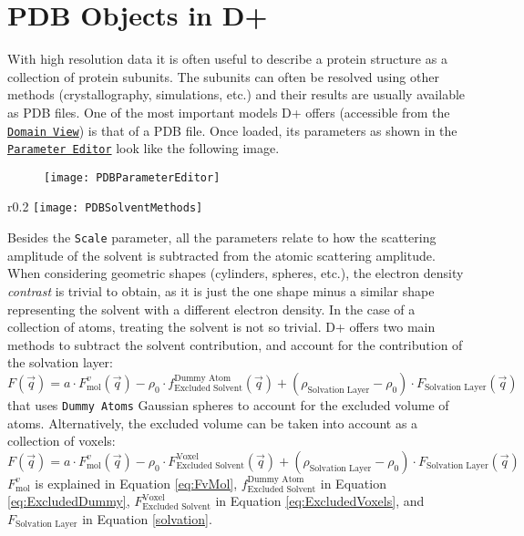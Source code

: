 \documentclass[../D+Manual.tex]{subfiles}
\begin{document}
\section{PDB Objects in D+}

With high resolution data it is often useful to describe a protein structure as a collection of protein subunits.
The subunits can often be resolved using other methods (crystallography, simulations, etc.) and their results are usually available as PDB files.
One of the most important models D+ offers (accessible from the \hyperref[sec:domainView]{\texttt{Domain View}}) is that of a PDB file.
Once loaded, its parameters as shown in the \hyperref[sec:parameterEditor]{\texttt{Parameter Editor}} look like the following image.
\begin{figure}[h]
\centering
\texttt{[image: PDBParameterEditor]}
\label{fig:PDBParameterEditor}
\end{figure}
\begin{wrapfigure}{r}{0.2\textwidth}
	\vspace{-20pt}
	\centering
	\texttt{[image: PDBSolventMethods]}
	\vspace{-30pt}
\end{wrapfigure}
Besides the \texttt{Scale} parameter, all the parameters relate to how the scattering amplitude of the solvent is subtracted from the atomic scattering amplitude.
When considering geometric shapes (cylinders, spheres, etc.), the electron density \textit{contrast} is trivial to obtain, as it is just the one shape minus a similar shape representing the solvent with a different electron density.
In the case of a collection of atoms, treating the solvent is not so trivial.
D+ offers two main methods to subtract the solvent contribution, and account for the contribution of the solvation layer:
\begin{equation}\label{sv}
F(\vec{q})=a\cdot F^v_{\text{mol}}(\vec{q}) - \rho_{0}\cdot f_{\text{Excluded Solvent}}^{\text{Dummy Atom}}(\vec{q}) + \left(\rho_{\text{Solvation Layer}}-\rho_{0}\right) \cdot F_\text{Solvation Layer}\left(\vec{q}\right)
\end{equation}
that uses \texttt{Dummy Atoms} Gaussian spheres to account for the excluded volume of atoms. Alternatively, the excluded volume can be taken into account as a collection of voxels:    
\begin{equation}
\label{sv2}
F(\vec{q})=a\cdot F^v_{\text{mol}}(\vec{q}) - \rho_{0}\cdot F^{\text{Voxel}}_\text{Excluded Solvent}(\vec{q}) + \left(\rho_{\text{Solvation Layer}}-\rho_{0}\right) \cdot F_\text{Solvation Layer}\left(\vec{q}\right)
\end{equation}
$F^v_{\text{mol}}$ is explained in Equation \ref{eq:FvMol}, $f_{\text{Excluded Solvent}}^{\text{Dummy Atom}}$ in Equation \ref{eq:ExcludedDummy},
$F^{\text{Voxel}}_\text{Excluded Solvent}$ in Equation \ref{eq:ExcludedVoxels}, and $F_\text{Solvation Layer}$ in Equation \ref{solvation}.
\end{document}
